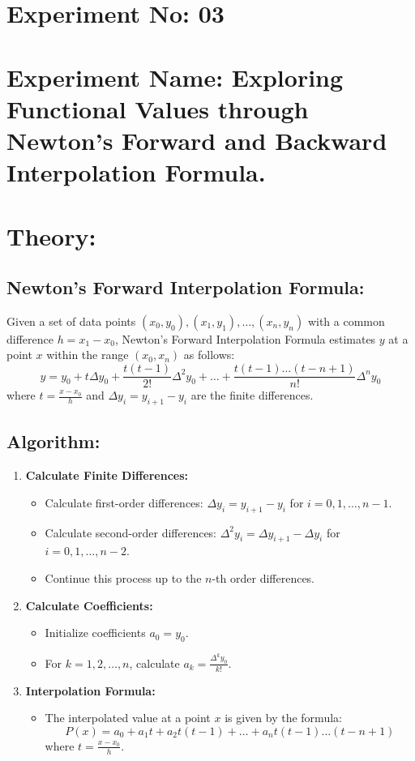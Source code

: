 \documentclass[a4paper,12pt]{report}
\begin{document}
\section*{Experiment No: 03}
\section*{Experiment Name: \small Exploring Functional Values through Newton's Forward and Backward Interpolation Formula.}
\section*{Theory:}

\subsection*{Newton's Forward Interpolation Formula:}
\qquad Given a set of data points $(x_0, y_0), (x_1, y_1), \ldots, (x_n, y_n)$ with a common difference $h = x_1 - x_0$, Newton's Forward Interpolation Formula estimates $y$ at a point $x$ within the range $(x_0, x_n)$ as follows: \[ y = y_0 + t \Delta y_0 + \frac{t(t-1)}{2!} \Delta^2 y_0 + \ldots + \frac{t(t-1)\ldots(t-n+1)}{n!} \Delta^n y_0 \] where $t = \frac{x - x_0}{h}$ and $\Delta y_i = y_{i+1} - y_i$ are the finite differences.

\subsection*{Algorithm:}
\begin{enumerate}
    \item \textbf{Calculate Finite Differences:}
          \begin{itemize}
              \item Calculate first-order differences: $\Delta y_i = y_{i+1} - y_i$ for $i = 0, 1, \ldots, n-1$.
              \item Calculate second-order differences: $\Delta^2 y_i = \Delta y_{i+1} - \Delta y_i$ for $i = 0, 1, \ldots, n-2$.
              \item Continue this process up to the $n$-th order differences.
          \end{itemize}
    \item \textbf{Calculate Coefficients:}
          \begin{itemize}
              \item Initialize coefficients $a_0 = y_0$.
              \item For $k = 1, 2, \ldots, n$, calculate $a_k = \frac{\Delta^k y_0}{k!}$.
          \end{itemize}
    \item \textbf{Interpolation Formula:}
          \begin{itemize}
              \item The interpolated value at a point $x$ is given by the formula:
                    \[ P(x) = a_0 + a_1 t + a_2 t(t-1) + \ldots + a_n t(t-1)\ldots(t-n+1) \]
                    where $t = \frac{x - x_0}{h}$.
          \end{itemize}
\end{enumerate}
\end{document}
